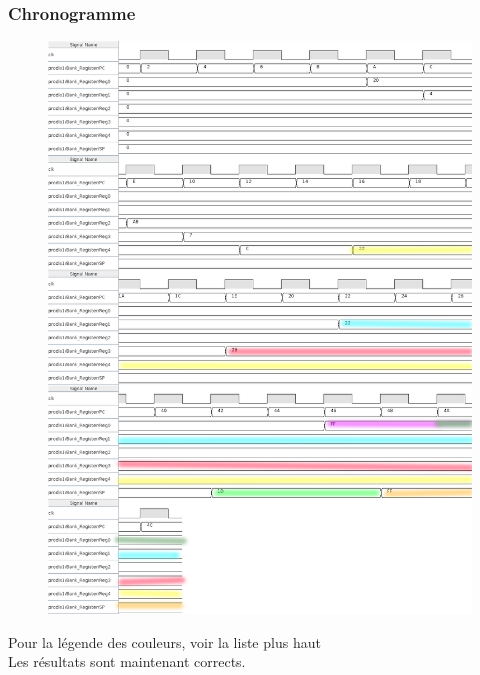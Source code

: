 \documentclass[a4paper]{article} %
\begin{document}
\subsubsection{Chronogramme}
\begin{figure}[H]
    \centering
    \includegraphics[width=.8\textwidth]{src/CHRONO_ET2_CORR_COL.png}
    \label{fig:chrono_et2_corr_pic}
\end{figure}
Pour la légende des couleurs, voir la liste plus haut \\
Les résultats sont maintenant corrects.
\end{document}
